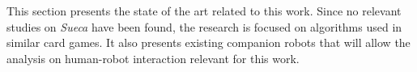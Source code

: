 \label{chapter:related-work}

This section presents the state of the art related to this work.
Since no relevant studies on \emph{Sueca} have been found, the research is focused on algorithms used in similar card games.
It also presents existing companion robots that will allow the analysis on human-robot interaction relevant for this work.



